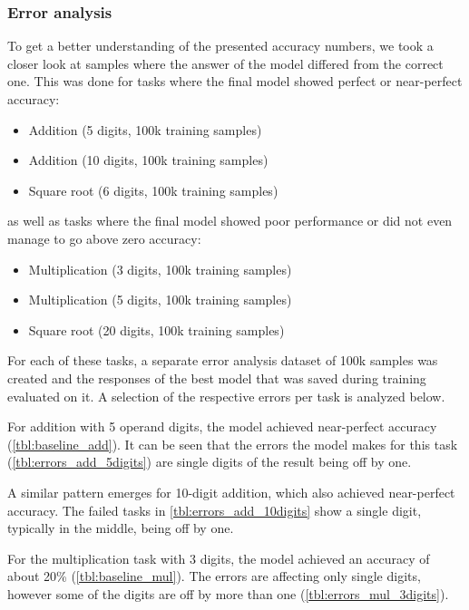 \FloatBarrier
\subsubsection{Error analysis}
\label{error_analysis}

To get a better understanding of the presented accuracy numbers, we took a closer look at samples where the answer of the model differed from the correct one. This was done for tasks where the final model showed perfect or near-perfect accuracy:

\begin{itemize}
	\item Addition (5 digits, 100k training samples)
	\item Addition (10 digits, 100k training samples)
	\item Square root (6 digits, 100k training samples)
\end{itemize}

as well as tasks where the final model showed poor performance or did not even manage to go above zero accuracy:

\begin{itemize}
	\item Multiplication (3 digits, 100k training samples)
	\item Multiplication (5 digits, 100k training samples)
	\item Square root (20 digits, 100k training samples)
\end{itemize}

For each of these tasks, a separate error analysis dataset of 100k samples was created and the responses of the best model that was saved during training evaluated on it. A selection of the respective errors per task is analyzed below.

For addition with 5 operand digits, the model achieved near-perfect accuracy (\cref{tbl:baseline_add}).
It can be seen that the errors the model makes for this task (\cref{tbl:errors_add_5digits}) are single digits of the result being off by one.


A similar pattern emerges for 10-digit addition, which also achieved near-perfect accuracy. The failed tasks in \cref{tbl:errors_add_10digits} show a single digit, typically in the middle, being off by one. 


For the multiplication task with 3 digits, the model achieved an accuracy of about 20\% (\cref{tbl:baseline_mul}). The errors are affecting only single digits, however some of the digits are off by more than one (\cref{tbl:errors_mul_3digits}).


